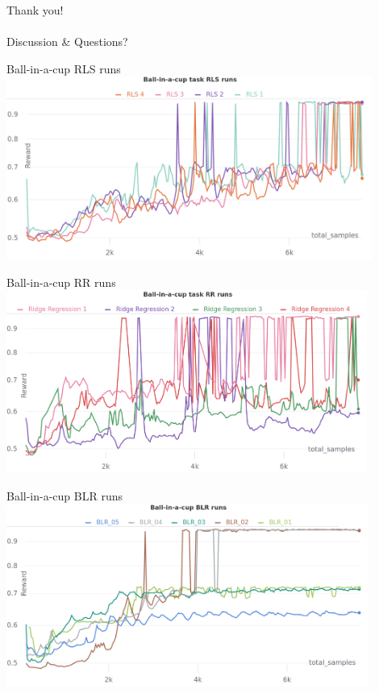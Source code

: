 \documentclass[navbarinfooter, 12pt]{sdqbeamer}
\begin{document}
\begin{frame}{}
  \centering
  \huge
  Thank you! \\
  $ $ \\
  Discussion \& Questions?
\end{frame}

\appendix
\beginbackup


\begin{frame}{Ball-in-a-cup RLS runs}
  \centering
  \includegraphics[height=6cm]{figures/cup_rls_runs.png}
\end{frame}

\begin{frame}{Ball-in-a-cup RR runs}
  \centering
  \includegraphics[height=6cm]{figures/cup_rr_runs.png}
\end{frame}

\begin{frame}{Ball-in-a-cup BLR runs}
  \centering
  \includegraphics[height=6cm]{figures/cup_blr_runs.png}
\end{frame}
\end{document}
